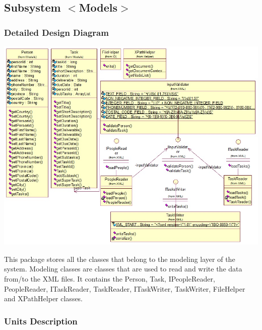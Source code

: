 \subsection{Subsystem $<$Models$>$}

\subsubsection{Detailed Design Diagram}
\includegraphics{subsystems/diagrams/models_class_diagram}

This package stores all the classes that belong to the modeling layer of the system. Modeling classes are classes that are used to read and write the data from/to the XML files. It contains the Person, Task, IPeopleReader, PeopleReader, ITaskReader, TaskReader, ITaskWriter, TaskWriter, FileHelper and XPathHelper classes.

\subsubsection{Units Description}

